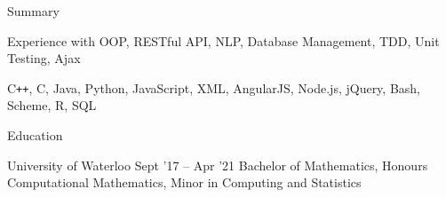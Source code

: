 \documentclass{resume} %
\begin{document}

\begin{rSection}{Summary}
  \begin{rSummarySection}
  {
    \item Experience with OOP, RESTful API, NLP, Database Management, TDD, Unit Testing, Ajax
    \item C\texttt{++}, C, Java, Python, JavaScript, XML, AngularJS, Node.js, jQuery, Bash, Scheme, R, SQL
  }
  \end{rSummarySection}
\end{rSection}


\begin{rSection}{Education}
  \begin{rEducationSection}{University of Waterloo}
                           {Sept '17 -- Apr '21}
                           {Bachelor of Mathematics, Honours Computational Mathematics, Minor in Computing and Statistics}
  \end{rEducationSection}
\end{rSection}
\vspace{-1.5em}
\end{document}
